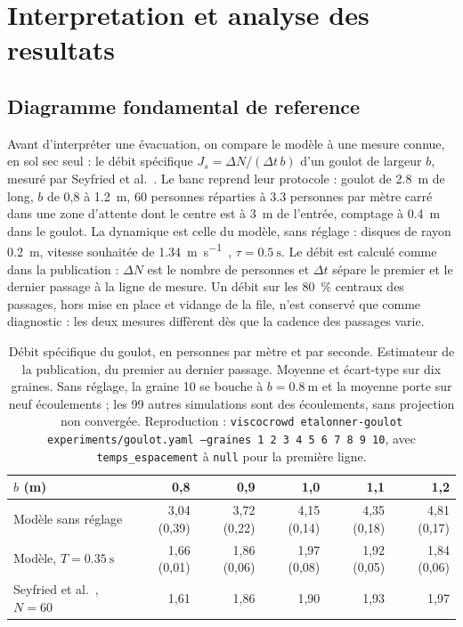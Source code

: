 \section{Interpretation et analyse des resultats}
\label{sec:resultats}


\subsection{Diagramme fondamental de reference}
\label{sec:e0}

Avant d'interpréter une évacuation, on compare le modèle à une mesure connue, en
sol sec seul : le débit spécifique $J_s=\Delta N/(\Delta t\,b)$ d'un goulot de
largeur $b$, mesuré par Seyfried et al.~\cite{seyfried2009}. Le banc reprend leur protocole :
goulot de \SI{2.8}{\metre} de long, $b$ de 0,8 à \SI{1.2}{\metre}, 60 personnes
réparties à \num{3.3} personnes par mètre carré dans une zone d'attente dont le
centre est à \SI{3}{\metre} de l'entrée, comptage à \SI{0.4}{\metre} dans le goulot.
La dynamique est celle du modèle, sans réglage : disques de rayon \SI{0.2}{\metre},
vitesse souhaitée de \SI{1.34}{\metre\per\second}~\cite{weidmann1993},
$\tau=\SI{0.5}{\second}$. Le débit est calculé comme dans la publication :
$\Delta N$ est le nombre de personnes et $\Delta t$ sépare le premier et le dernier
passage à la ligne de mesure. Un débit sur les \SI{80}{\percent} centraux des
passages, hors mise en place et vidange de la file, n'est conservé que comme
diagnostic : les deux mesures diffèrent dès que la cadence des passages varie.

\begin{table}[ht]
\centering
\caption{Débit spécifique du goulot, en personnes par mètre et par seconde.
Estimateur de la publication, du premier au dernier passage. Moyenne et
écart-type sur dix graines. Sans réglage, la graine 10 se bouche à
$b=\SI{0.8}{\metre}$ et la moyenne porte sur neuf écoulements ; les 99 autres
simulations sont des écoulements, sans projection non convergée.
Reproduction : \texttt{viscocrowd etalonner-goulot experiments/goulot.yaml --graines 1 2
3 4 5 6 7 8 9 10}, avec \texttt{temps\_espacement} à \texttt{null} pour la première ligne.}
\label{tab:e0}
\begin{tabular}{lrrrrr}
\toprule
$b$ (m) & 0,8 & 0,9 & 1,0 & 1,1 & 1,2 \\
\midrule
Modèle sans réglage & 3,04 (0,39) & 3,72 (0,22) & 4,15 (0,14) & 4,35 (0,18) & 4,81 (0,17) \\
Modèle, $T=\SI{0.35}{\second}$ & 1,66 (0,01) & 1,86 (0,06) & 1,97 (0,08) & 1,92 (0,05) & 1,84 (0,06) \\
Seyfried et al.~\cite{seyfried2009}, $N=60$ & 1,61 & 1,86 & 1,90 & 1,93 & 1,97 \\
\bottomrule
\end{tabular}
\end{table}

